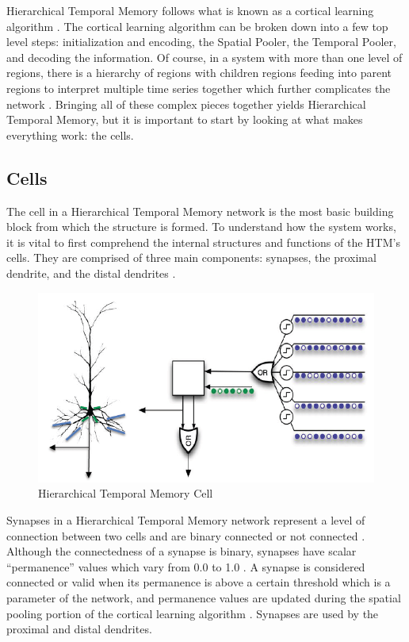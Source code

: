 \documentclass[fleqn,notitlepage,minimal]{article}
\begin{document}
	Hierarchical Temporal Memory follows what is known as a cortical learning algorithm \cite{Principles}. The cortical learning algorithm can be broken down into a few top level steps: initialization and encoding, the Spatial Pooler, the Temporal Pooler, and decoding the information. Of course, in a system with more than one level of regions, there is a hierarchy of regions with children regions feeding into parent regions to interpret multiple time series together which further complicates the network \cite{Dillon}. Bringing all of these complex pieces together yields Hierarchical Temporal Memory, but it is important to start by looking at what makes everything work: the cells.
	
	\subsection{Cells}
	
	The cell in a Hierarchical Temporal Memory network is the most basic building block from which the structure is formed. To understand how the system works, it is vital to first comprehend the internal structures and functions of the HTM's cells. They are comprised of three main components: synapses, the proximal dendrite, and the distal dendrites \cite{Whitepaper}.
	
	\begin{figure}[h!]
		\centering
		\includegraphics[width=\linewidth]{images/HTMCell.jpg}
		\caption{Hierarchical Temporal Memory Cell}
		\label{fig 1}
	\end{figure}
	
	Synapses in a Hierarchical Temporal Memory network represent a level of connection between two cells and are binary connected or not connected \cite{Whitepaper}. Although the connectedness of a synapse is binary, synapses have scalar ``permanence'' values which vary from 0.0 to 1.0 \cite{Principles}. A synapse is considered connected or valid when its permanence is above a certain threshold which is a parameter of the network, and permanence values are updated during the spatial pooling portion of the cortical learning algorithm \cite{Whitepaper}. Synapses are used by the proximal and distal dendrites.
	
\end{document}
